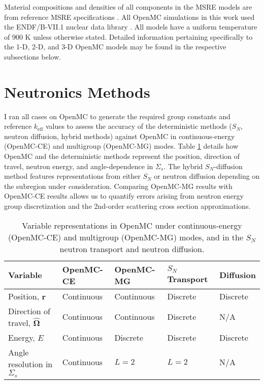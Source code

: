 Material compositions and densities of all components in the \gls{MSRE} models are from reference
\gls{MSRE} specifications \cite{robertson_msre_1965, fratoni_molten_2020}.
All OpenMC simulations in this work used the ENDF/B-VII.1 nuclear data library
\cite{chadwick_endf/b-vii.1_2011}. All models have a uniform
temperature of 900 K unless otherwise stated. Detailed information pertaining specifically to the
1-D, 2-D, and 3-D OpenMC models may be found in the respective subsections below.

\section{Neutronics Methods} \label{sec:nts-methods}

I ran all cases on OpenMC to generate the required group constants and reference $k_\text{eff}$
values to assess the accuracy of the deterministic methods ($S_N$, neutron diffusion, hybrid 
methods) against OpenMC in continuous-energy (OpenMC-CE) and multigroup (OpenMC-MG) modes. Table
\ref{table:var} details how OpenMC and the deterministic methods represent the position, direction
of travel, neutron energy, and angle-dependence in $\Sigma_s$. The hybrid $S_N$-diffusion method
features representations from either $S_N$ or neutron diffusion depending on the subregion under
consideration. Comparing OpenMC-MG results with OpenMC-CE results allows us
to quantify errors arising from neutron energy group discretization and the 2nd-order scattering
cross section approximations.

\begin{table}[htb!]
  \centering
  \footnotesize
  \caption{Variable representations in OpenMC under continuous-energy (OpenMC-CE) and multigroup
  (OpenMC-MG) modes, and in the $S_N$ neutron transport and neutron diffusion.}
  \begin{tabular}{l l l l l}
    \toprule
    Variable & OpenMC-CE & OpenMC-MG & $S_N$ Transport & Diffusion \\
    \midrule
    Position, $\bm{r}$ & Continuous & Continuous & Discrete & Discrete \\
    Direction of travel, $\bm{\hat{\Omega}}$ & Continuous & Continuous & Discrete & N/A \\
    Energy, $E$ & Continuous & Discrete & Discrete & Discrete \\
    Angle resolution in $\Sigma_s$ & Continuous & $L=2$ & $L=2$ & N/A \\
    \bottomrule
  \end{tabular}
  \label{table:var}
\end{table}

